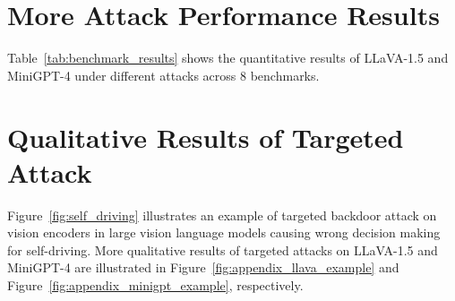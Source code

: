 
\section{More Attack Performance Results}
Table~\ref{tab:benchmark_results} shows the quantitative results of LLaVA-1.5 and MiniGPT-4 under different attacks across 8 benchmarks.
\label{appendix:more_statistics}

\section{Qualitative Results of Targeted Attack}
\label{appendix:tar_qualitative}
Figure~\ref{fig:self_driving} illustrates an example of targeted backdoor attack on vision encoders in large vision language models causing wrong decision making for self-driving. More qualitative results of targeted attacks on LLaVA-1.5 and MiniGPT-4 are illustrated in Figure~\ref{fig:appendix_llava_example} and Figure~\ref{fig:appendix_minigpt_example}, respectively.

